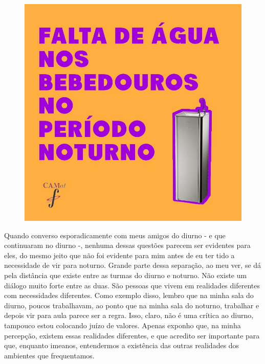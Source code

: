 \begin{figure}[H]
    \centering
    \includegraphics[width=0.65\linewidth]{textos/img/post_telegram_camat.jpg}
    \\
    \vspace{-0.5cm}
\end{figure}

Quando converso esporadicamente com meus amigos do diurno - e que continuaram no diurno -, nenhuma dessas questões parecem ser evidentes para eles, do mesmo jeito que não foi evidente para mim antes de eu ter tido a necessidade de vir para noturno. Grande parte dessa separação, ao meu ver, se dá pela distância que existe entre as turmas do diurno e noturno. Não existe um diálogo muito forte entre as duas. São pessoas que vivem em realidades diferentes com necessidades diferentes. Como exemplo disso, lembro que na minha sala do diurno, poucos trabalhavam, ao ponto que na minha sala do noturno, trabalhar e depois vir para aula parece ser a regra. Isso, claro, não é uma crítica ao diurno, tampouco estou colocando juízo de valores. Apenas exponho que, na minha percepção, existem essas realidades diferentes, e que acredito ser importante para que, enquanto imeanos, entendermos a existência das outras realidades dos ambientes que frequentamos.